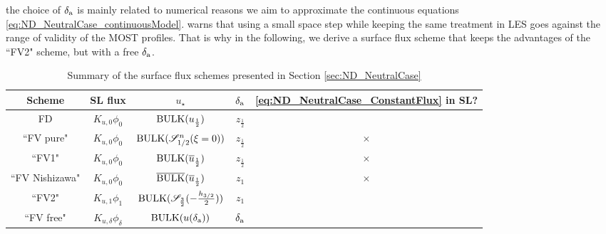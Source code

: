 the choice of $\delta_{\rm a}$ is mainly related to numerical
reasons we aim to approximate the continuous equations
\eqref{eq:ND_NeutralCase_continuousModel}.
\citep{basu_cautionary_2017} warns that using a small space step
while keeping the same treatment in LES goes against the
range of validity of the MOST profiles.
That is why in the following,
we derive a surface flux scheme that keeps
the advantages of the ``FV2" scheme, but with a free $\delta_{\rm a}$.
%
\begin{table}
	\centering
\begin{tabular}{c|c|c|c|c}
	Scheme & SL flux & $u_\star$ & $\delta_{\rm a}$ 
		& \eqref{eq:ND_NeutralCase_ConstantFlux} in SL? \\
		\hline
		FD & $K_{u,0} \phi_0$ & ${\rm BULK}(u_{\frac{1}{2}})$
			& $z_{\frac{1}{2}}$ & \checkmark \\
		``FV pure" & $K_{u,0} \phi_0$ &
			${\rm BULK}({\cal S}_{1/2}^{n}(\xi=0))$
			& $z_{\frac{1}{2}}$ & $\times$ \\
		``FV1" & $K_{u,0} \phi_0$ &
			${\rm BULK}(\overline{u}_{\frac{1}{2}})$
			& $z_{\frac{1}{2}}$ & $\times$ \\
		``FV Nishizawa" & $K_{u,0} \phi_0$ &
			$\overline{\rm BULK}
				(\overline{u}_{\frac{1}{2}})$
			& $z_1$ & $\times$ \\
		``FV2" & $K_{u,1} \phi_1$ &
			${\rm BULK} ({\cal S}_{\frac{3}{2}}(
				  -\frac{h_{3/2}}{2}))$
			& $z_1$ & \checkmark \\
		``FV free" & $K_{u,\delta} \phi_{\delta}$ &
			${\rm BULK}
				(u(\delta_{\rm a}))$
			& $\delta_{\rm a}$ & \checkmark \\
	\end{tabular}
	\caption{Summary of the surface flux schemes presented in
	Section \ref{sec:ND_NeutralCase}}
	\label{tab:ND_NeutralCase_summary_sfscheme}
\end{table}
